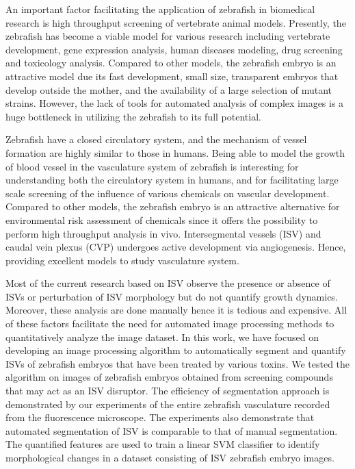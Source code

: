 An important factor facilitating the application of zebrafish in biomedical research is high throughput screening of vertebrate animal models. Presently, the zebrafish has become a viable model for various research including vertebrate development, gene expression analysis, human diseases modeling, drug screening and toxicology analysis. Compared to other models, the zebrafish embryo is an attractive model due its fast development, small size, transparent embryos that develop outside the mother, and the availability of a large selection of mutant strains. However, the lack of tools for automated analysis of complex images is a huge bottleneck in utilizing the zebrafish to its full potential. 

Zebrafish have a closed circulatory system, and the mechanism of vessel formation are highly similar to those in humans. Being able to model the growth of blood vessel in the vasculature system of zebrafish is interesting for understanding both the circulatory system in humans, and for facilitating large scale screening of the influence of various chemicals on vascular development. Compared to other models, the zebrafish embryo is an attractive alternative for environmental risk assessment of chemicals since it offers the possibility to perform high throughput analysis in vivo. Intersegmental vessels (ISV) and caudal vein plexus (CVP) undergoes active development via angiogenesis. Hence, providing excellent models to study vasculature system.

Most of the current research based on ISV observe the presence or absence of ISVs or perturbation of ISV morphology but do not quantify growth dynamics. Moreover, these analysis are done manually hence it is tedious and expensive. All of these factors facilitate the need for automated image processing methods to quantitatively analyze the image dataset. In this work, we have focused on developing an image processing algorithm to automatically segment and quantify ISVs of zebrafish embryos that have been treated by various toxins. We tested the algorithm on images of zebrafish embryos obtained from screening compounds that may act as an ISV disruptor. The efficiency of segmentation approach is demonstrated by our experiments of the entire zebrafish vasculature recorded from the fluorescence microscope. The experiments also demonstrate that automated segmentation of ISV is comparable to that of manual segmentation. The quantified features are used to train a linear SVM classifier to identify morphological changes in a dataset consisting of ISV zebrafish embryo images. 

